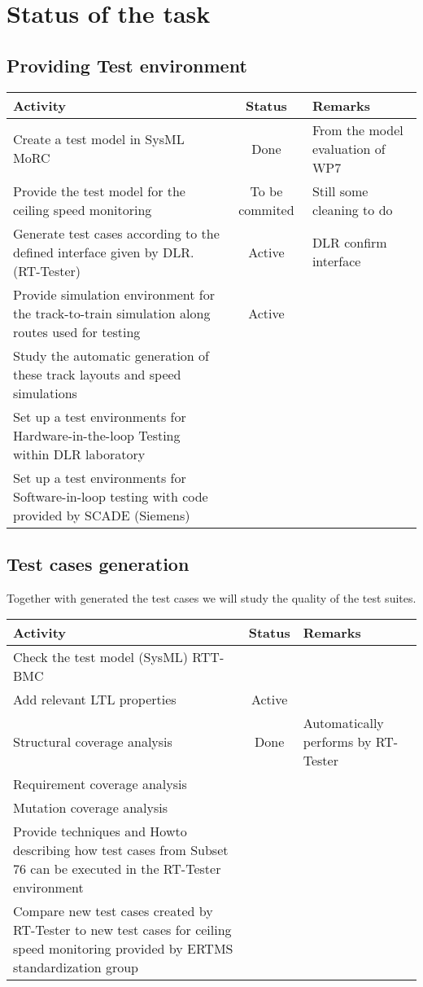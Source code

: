 \documentclass[11pt, a4paper]{article}
\begin{document}
\section{Status of the task}
\subsection{Providing Test environment}
\begin{tabular}{p{}cp{}}\toprule
Activity & Status & Remarks \\\midrule
 Create a test model in SysML MoRC & Done &  From the model evaluation
 of WP7\\\midrule
Provide the test model for the ceiling speed monitoring & To be
commited & Still some cleaning to do \\\midrule
Generate test cases according to the defined interface given by
  DLR. (RT-Tester) & Active & DLR confirm interface \\ \midrule
Provide simulation environment for the
  track-to-train simulation  along routes used
  for testing & Active & \\\midrule
Study the automatic generation of these track layouts and speed
  simulations & & \\\midrule
Set up a test environments for
Hardware-in-the-loop Testing within DLR laboratory & & \\\midrule
Set up a test environments for Software-in-loop testing with code
provided by SCADE (Siemens) & & \\
\bottomrule
\end{tabular}

\subsection{Test cases generation}
Together with generated the test cases we will study the quality of
the test suites.

\begin{tabular}{p{}cp{}}\toprule
Activity & Status & Remarks \\\midrule
Check the test model (SysML) RTT-BMC  &&\\\midrule
Add relevant LTL properties & Active&\\\midrule
Structural coverage analysis & Done & Automatically performs by  RT-Tester\\\midrule
 Requirement coverage analysis &&\\\midrule
 Mutation coverage  analysis &&\\\midrule
 Provide techniques and Howto describing how test cases from
  Subset 76 can be executed in the RT-Tester environment &&\\\midrule
 Compare new test cases created by RT-Tester to new test cases
  for ceiling speed monitoring provided by ERTMS standardization
  group &&\\
\bottomrule
\end{tabular}
\end{document}
